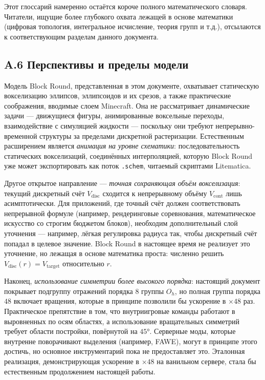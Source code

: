 \documentclass[12pt,a4paper]{scrartcl}
\newcommand{\code}[1]{\texttt{\small #1}}
\begin{document}
Этот глоссарий намеренно остаётся короче полного математического словаря. Читатели, ищущие более глубокого охвата лежащей в основе математики (цифровая топология, интегральное исчисление, теория групп и т.д.), отсылаются к соответствующим разделам данного документа.

\subsection*{A.6 Перспективы и пределы модели}

Модель Block Round, представленная в этом документе, охватывает статическую вокселизацию эллипсов, эллипсоидов и их срезов, а также практические соображения, вводимые слоем Minecraft. Она не рассматривает динамические задачи --- движущиеся фигуры, анимированные воксельные переходы, взаимодействие с симуляцией жидкости --- поскольку они требуют непрерывно-временной структуры за пределами дискретной растеризации. Естественным расширением является \emph{анимация на уровне схематики}: последовательность статических вокселизаций, соединённых интерполяцией, которую Block Round уже может экспортировать как поток \code{.schem}, читаемый скриптами Litematica.

Другое открытое направление --- \emph{точная сохраняющая объём вокселизация}: текущий дискретный счёт $V_{\mathrm{disc}}$ сходится к непрерывному объёму $V_{\mathrm{cont}}$ лишь асимптотически. Для приложений, где точный счёт должен соответствовать непрерывной формуле (например, рендеринговые соревнования, математическое искусство со строгим бюджетом блоков), необходим дополнительный слой уточнения --- например, лёгкая регулировка радиуса так, чтобы дискретный счёт попадал в целевое значение. Block Round в настоящее время не реализует это уточнение, но лежащая в основе математика проста: численно решить $V_{\mathrm{disc}}(r) = V_{\mathrm{target}}$ относительно $r$.

Наконец, \emph{использование симметрии более высокого порядка}: настоящий документ покрывает подгруппу отражений порядка $8$ группы $O_h$, но полная группа порядка $48$ включает вращения, которые в принципе позволили бы ускорение в $\times 48$ раз. Практическое препятствие в том, что внутриигровые команды работают в выровненных по осям областях, а использование вращательных симметрий требует области постройки, повёрнутой на $45°$. Серверные моды, которые внутренне поворачивают выделения (например, FAWE), могут в принципе этого достичь, но основное инструментарий пока не предоставляет это. Эталонная реализация, демонстрирующая ускорение в $\times 48$ на ванильном сервере, стала бы естественным продолжением настоящей работы.
\end{document}
